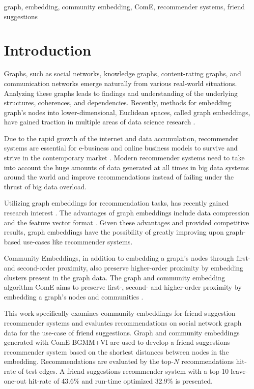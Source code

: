 \documentclass[conference]{IEEEtran}
\begin{document}
\begin{IEEEkeywords}
    graph, embedding, community embedding, ComE, recommender systems, friend suggestions
\end{IEEEkeywords}


\section{Introduction}

Graphs, such as social networks, knowledge graphs, content-rating graphs, and communication networks emerge naturally from various real-world situations. Analyzing these graphs leads to findings and understanding of the underlying structures, coherences, and dependencies. Recently, methods for embedding graph's nodes into lower-dimensional, Euclidean spaces, called graph embeddings, have gained traction in multiple areas of data science research \cite{Goyal_2018}.

Due to the rapid growth of the internet and data accumulation, recommender systems are essential for e-business and online business models to survive and strive in the contemporary market \cite{Polatidis2013RecommenderST}. Modern recommender systems need to take into account the huge amounts of data generated at all times in big data systems around the world and improve recommendations instead of failing under the thrust of big data overload.

Utilizing graph embeddings for recommendation tasks, has recently gained research interest \cite{Palumbo2018AnEC, Palumbo2018KnowledgeGE, GradGyenge2017GraphEB, Sathish2019GraphEB}. The advantages of graph embeddings include data compression and the feature vector format \cite{Godec2018}. Given these advantages and provided competitive results, graph embeddings have the possibility of greatly improving upon graph-based use-cases like recommender systems.

Community Embeddings, in addition to embedding a graph's nodes through first- and second-order proximity, also preserve higher-order proximity by embedding clusters present in the graph data. The graph and community embedding algorithm ComE aims to preserve first-, second- and higher-order proximity by embedding a graph's nodes and communities \cite{ComE}.

This work specifically examines community embeddings for friend suggestion recommender systems and evaluates recommendations on social network graph data for the use-case of friend suggestions. Graph and community embeddings generated with ComE BGMM+VI are used to develop a friend suggestions recommender system based on the shortest distances between nodes in the embedding. Recommendations are evaluated by the top-$N$ recommendations hit-rate of test edges. A friend suggestions recommender system with a top-10 leave-one-out hit-rate of 43.6\% and run-time optimized 32.9\% is presented.
\end{document}
